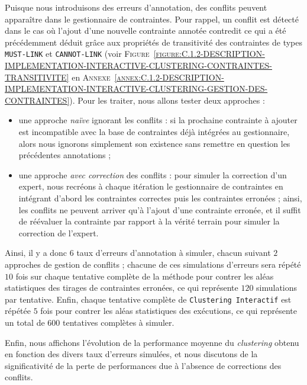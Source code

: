 			Puisque nous introduisons des erreurs d'annotation, des conflits peuvent apparaître dans le gestionnaire de contraintes.
			Pour rappel, un conflit est détecté dans le cas où l'ajout d'une nouvelle contrainte annotée contredit ce qui a été précédemment déduit grâce aux propriétés de transitivité des contraintes de types \texttt{MUST-LINK} et \texttt{CANNOT-LINK} (voir \textsc{Figure~\ref{figure:C.1.2-DESCRIPTION-IMPLEMENTATION-INTERACTIVE-CLUSTERING-CONTRAINTES-TRANSITIVITE}} en \textsc{Annexe~\ref{annex:C.1.2-DESCRIPTION-IMPLEMENTATION-INTERACTIVE-CLUSTERING-GESTION-DES-CONTRAINTES}}).
			Pour les traiter, nous allons tester deux approches :
			\begin{itemize}
				\item une approche \textit{naïve} ignorant les conflits : si la prochaine contrainte à ajouter est incompatible avec la base de contraintes déjà intégrées au gestionnaire, alors nous ignorons simplement son existence sans remettre en question les précédentes annotations ;
				\item une approche \textit{avec correction} des conflits : pour simuler la correction d'un expert, nous recréons à chaque itération le gestionnaire de contraintes en intégrant d'abord les contraintes correctes puis les contraintes erronées ; ainsi, les conflits ne peuvent arriver qu'à l'ajout d'une contrainte erronée, et il suffit de réévaluer la contrainte par rapport à la vérité terrain pour simuler la correction de l'expert.
			\end{itemize}
			
			Ainsi, il y a donc $6$ taux d'erreurs d'annotation à simuler, chacun suivant $2$ approches de gestion de conflits ; chacune de ces simulations d'erreurs sera répété $10$ fois sur chaque tentative complète de la méthode pour contrer les aléas statistiques des tirages de contraintes erronées, ce qui représente $120$ simulations par tentative.
			Enfin, chaque tentative complète de \texttt{Clustering Interactif} est répétée $5$ fois pour contrer les aléas statistiques des exécutions, ce qui représente un total de $600$ tentatives complètes à simuler.

			Enfin, nous affichons l'évolution de la performance moyenne du \textit{clustering} obtenu en fonction des divers taux d'erreurs simulées, et nous discutons de la significativité de la perte de performances due à l'absence de corrections des conflits.
			
